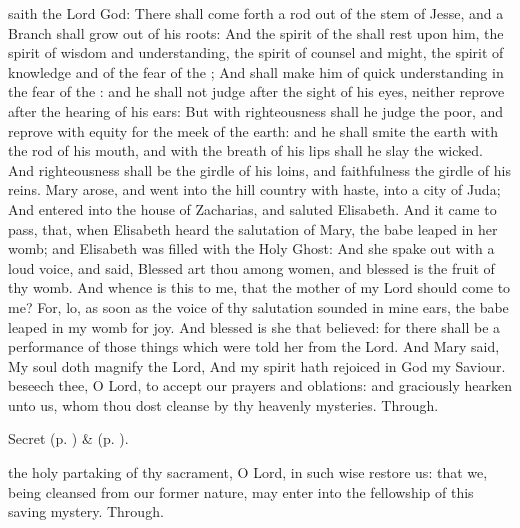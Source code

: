  saith the Lord God: There shall come forth a rod out of the stem of Jesse, and a Branch shall grow out of his roots: And the spirit of the  shall rest upon him, the spirit of wisdom and understanding, the spirit of counsel and might, the spirit of knowledge and of the fear of the ; And shall make him of quick understanding in the fear of the : and he shall not judge after the sight of his eyes, neither reprove after the hearing of his ears: But with righteousness shall he judge the poor, and reprove with equity for the meek of the earth: and he shall smite the earth with the rod of his mouth, and with the breath of his lips shall he slay the wicked. And righteousness shall be the girdle of his loins, and faithfulness the girdle of his reins.
 Mary arose, and went into the hill country with haste, into a city of Juda; And entered into the house of Zacharias, and saluted Elisabeth. And it came to pass, that, when Elisabeth heard the salutation of Mary, the babe leaped in her womb; and Elisabeth was filled with the Holy Ghost: And she spake out with a loud voice, and said, Blessed art thou among women, and blessed is the fruit of thy womb. And whence is this to me, that the mother of my Lord should come to me? For, lo, as soon as the voice of thy salutation sounded in mine ears, the babe leaped in my womb for joy. And blessed is she that believed: for there shall be a performance of those things which were told her from the Lord. And Mary said, My soul doth magnify the Lord, And my spirit hath rejoiced in God my Saviour.
\secret
{} beseech thee, O Lord, to accept our prayers and oblations: and graciously hearken unto us, whom thou dost cleanse by thy heavenly mysteries. Through.

\begin{rubric}
     Secret  (p. \pageref{AdventISecret}) \&   (p. \pageref{SPMaryInAdvent}).
\end{rubric}

\postcommunion
{} the holy partaking of thy sacrament, O Lord, in such wise restore us: that we, being cleansed from our former nature, may enter into the fellowship of this saving mystery. Through.

